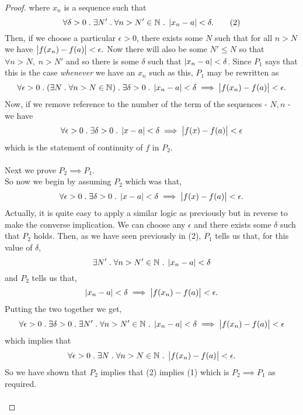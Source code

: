\documentclass[../MathsNotesBase.tex]{subfiles}
\begin{document}
{\begin{proof}
			where $x_n$ is a sequence such that
			\[ \forall \delta > 0 \;.\; \exists N' \;.\; \forall n > N' \in \mathbb{N}^{} \;.\; \left\lvert x_n - a\right\rvert < \delta. \tag{2} \]
			Then, if we choose a particular ${ \epsilon > 0 }$, there exists some $N$ such that for all ${ n > N }$ we have ${ \left\lvert f(x_n) - f(a)\right\rvert < \epsilon. }$ Now there will also be some $N' \leq N$ so that ${ \forall n > N, \; n > N' }$ and so there is some $\delta$ such that ${ \left\lvert x_n - a\right\rvert < \delta }$. Since $P_1$ says that this is the case \textit{whenever} we have an $x_n$ such as this, $P_1$ may be rewritten as
			\[ \forall \epsilon > 0 \;.\; (\exists N \;.\; \forall n > N \in \mathbb{N}^{}) \;.\; \exists \delta > 0 \;.\; \left\lvert x_n - a\right\rvert < \delta \implies \left\lvert f(x_n) - f(a)\right\rvert < \epsilon. \]
			Now, if we remove reference to the number of the term of the sequences - ${ N,n }$ - we have
			\[ \forall \epsilon > 0 \;.\; \exists \delta > 0 \;.\; \left\lvert x - a\right\rvert < \delta \implies \left\lvert f(x) - f(a)\right\rvert < \epsilon \]
			which is the statement of continuity of $f$ in $P_2$.
			\\\\
			Next we prove ${ P_2 \implies P_1. }$\\
			So now we begin by assuming $P_2$ which was that,
			\[ \forall \epsilon > 0 \;.\; \exists \delta > 0 \;.\; \left\lvert x - a\right\rvert < \delta \implies \left\lvert f(x) - f(a)\right\rvert < \epsilon. \]
			Actually, it is quite easy to apply a similar logic as previously but in reverse to make the converse implication. We can choose any $\epsilon$ and there exists some $\delta$ such that $P_2$ holds. Then, as we have seen previously in (2), $P_1$ tells us that, for this value of $\delta$,
			\[ \exists N' \;.\; \forall n > N' \in \mathbb{N}^{} \;.\; \left\lvert x_n - a\right\rvert < \delta \]
			and $P_2$ tells us that,
			\[ \left\lvert x_n - a\right\rvert < \delta \implies \left\lvert f(x_n) - f(a)\right\rvert < \epsilon. \]
			Putting the two together we get,
			\[ \forall \epsilon > 0 \;.\; \exists \delta > 0 \;.\; \exists N' \;.\; \forall n > N' \in \mathbb{N}^{} \;.\; \left\lvert x_n - a\right\rvert < \delta \implies \left\lvert f(x_n) - f(a)\right\rvert < \epsilon \]
			which implies that
			\[ \forall \epsilon > 0 \;.\; \exists N \;.\; \forall n > N \in \mathbb{N}^{} \;.\; \left\lvert f(x_n) - f(a)\right\rvert < \epsilon. \]
			So we have shown that $P_2$ implies that (2) implies (1) which is ${ P_2 \implies P_1 }$ as required.\\\\
			

\end{proof}}
\end{document}
